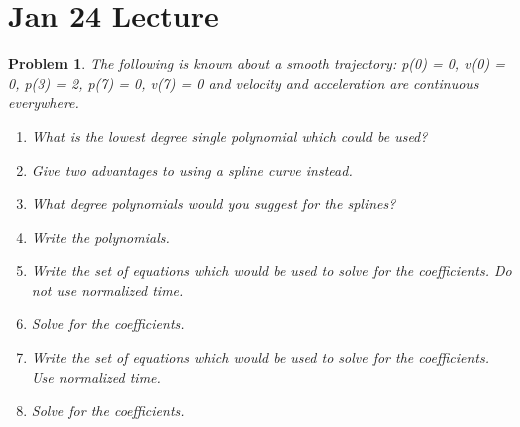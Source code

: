 \documentclass[twocolumn]{article}
\newtheorem{prob}{Problem}
\begin{document}
\section{Jan 24 Lecture}
\begin{prob}
  The following is known about a smooth trajectory: p(0) = 0, v(0) = 0, 
  p(3) = 2, p(7) = 0, v(7) = 0 and velocity and acceleration are 
  continuous everywhere.  

  \begin{enumerate}
  \item What is the lowest degree single polynomial which could be used?  
  \item Give two advantages to using a spline curve instead. 
  \item What degree polynomials would you suggest for the splines?  
  \item Write the polynomials.  
  \item Write the set of equations which would be used to solve for the coefficients. Do not use normalized time. 
  \item Solve for the coefficients.
  \item Write the set of equations which would be used to solve for the coefficients. Use normalized time. 
  \item Solve for the coefficients.
  \end{enumerate}
\end{prob}




\end{document}
